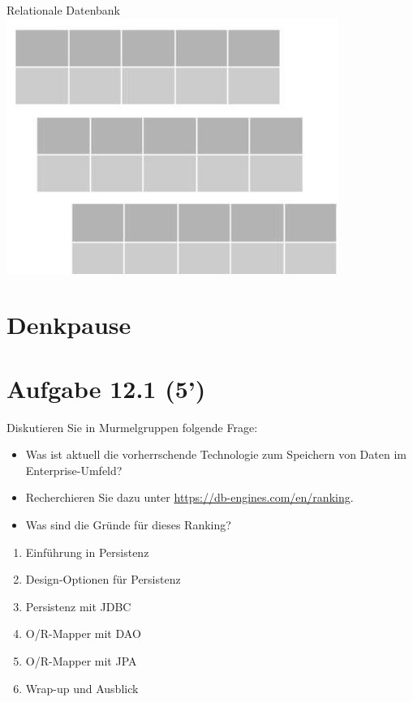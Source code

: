 \documentclass[10pt]{article}
\begin{document}
Relationale Datenbank\\
\includegraphics[max width=\textwidth, center]{2025_01_02_5ba1dc702e9f94ba8e06g-06(1)}

\section*{Denkpause}
\section*{Aufgabe 12.1 (5')}
Diskutieren Sie in Murmelgruppen folgende Frage:

\begin{itemize}
  \item Was ist aktuell die vorherrschende Technologie zum Speichern von Daten im Enterprise-Umfeld?
  \item Recherchieren Sie dazu unter \href{https://db-engines.com/en/ranking}{https://db-engines.com/en/ranking}.
  \item Was sind die Gründe für dieses Ranking?
\end{itemize}

\begin{enumerate}
  \item Einführung in Persistenz
  \item Design-Optionen für Persistenz
  \item Persistenz mit JDBC
  \item O/R-Mapper mit DAO
  \item O/R-Mapper mit JPA
  \item Wrap-up und Ausblick
\end{enumerate}
\end{document}
